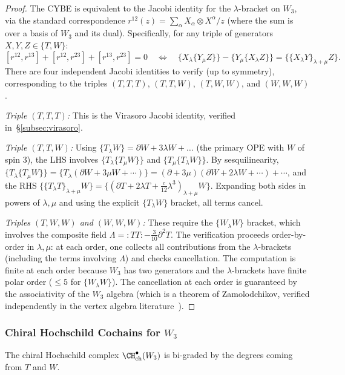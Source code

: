 \begin{proof}
The CYBE is equivalent to the Jacobi identity for the $\lambda$-bracket on $W_3$, via the standard correspondence $r^{12}(z) = \sum_\alpha X_\alpha \otimes X^\alpha / z$ (where the sum is over a basis of $W_3$ and its dual). Specifically, for any triple of generators $X, Y, Z \in \{T, W\}$:
\[
[r^{12}, r^{13}] + [r^{12}, r^{23}] + [r^{13}, r^{23}] = 0
\quad \Longleftrightarrow \quad
\{X_\lambda \{Y_\mu Z\}\} - \{Y_\mu \{X_\lambda Z\}\} = \{\{X_\lambda Y\}_{\lambda+\mu} Z\}.
\]
There are four independent Jacobi identities to verify (up to symmetry), corresponding to the triples $(T,T,T)$, $(T,T,W)$, $(T,W,W)$, and $(W,W,W)$.

\emph{Triple $(T,T,T)$:} This is the Virasoro Jacobi identity, verified in~\S\ref{subsec:virasoro}.

\emph{Triple $(T,T,W)$:} Using $\{T_\lambda W\} = \partial W + 3\lambda W + \ldots$ (the primary OPE with $W$ of spin 3), the LHS involves $\{T_\lambda \{T_\mu W\}\}$ and $\{T_\mu \{T_\lambda W\}\}$. By sesquilinearity, $\{T_\lambda \{T_\mu W\}\} = \{T_\lambda (\partial W + 3\mu W + \cdots)\} = (\partial + 3\mu)(\partial W + 2\lambda W + \cdots) + \cdots$, and the RHS $\{\{T_\lambda T\}_{\lambda+\mu} W\} = \{(\partial T + 2\lambda T + \frac{c}{12}\lambda^3)_{\lambda+\mu} W\}$. Expanding both sides in powers of $\lambda, \mu$ and using the explicit $\{T_\lambda W\}$ bracket, all terms cancel.

\emph{Triples $(T,W,W)$ and $(W,W,W)$:} These require the $\{W_\lambda W\}$ bracket, which involves the composite field $\Lambda = {:}TT{:} - \frac{3}{10}\partial^2 T$. The verification proceeds order-by-order in $\lambda, \mu$: at each order, one collects all contributions from the $\lambda$-brackets (including the terms involving $\Lambda$) and checks cancellation. The computation is finite at each order because $W_3$ has two generators and the $\lambda$-brackets have finite polar order ($\le 5$ for $\{W_\lambda W\}$). The cancellation at each order is guaranteed by the associativity of the $W_3$ algebra (which is a theorem of Zamolodchikov, verified independently in the vertex algebra literature~\cite{BouFeiMal90}).
\end{proof}

\subsubsection{Chiral Hochschild Cochains for $W_3$}

The chiral Hochschild complex $\CH^\bullet_{\text{ch}}(W_3)$ is bi-graded by the degrees coming from $T$ and $W$.

